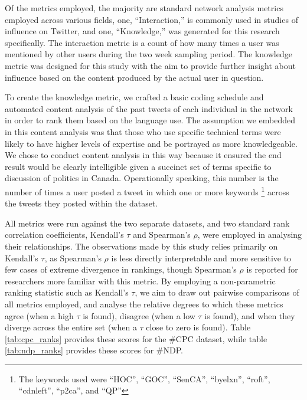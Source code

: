 \documentclass[a4paper,12pt]{article}
\begin{document}
Of the metrics employed, the majority are standard network analysis metrics employed across various fields, one, ``Interaction,'' is commonly used in studies of influence on Twitter, and one, ``Knowledge,'' was generated for this research specifically. The interaction metric is a count of how many times a user was mentioned by other users during the two week sampling period. The knowledge metric was designed for this study with the aim to provide further insight about influence based on the content produced by the actual user in question. 

To create the knowledge metric, we crafted a basic coding schedule and automated content analysis of the past tweets of each individual in the network in order to rank them based on the language use. The assumption we embedded in this content analysis was that those who use specific technical terms were likely to have higher levels of expertise and be portrayed as more knowledgeable. We chose to conduct content analysis in this way because it ensured the end result would be clearly intelligible given a succinct set of terms specific to discussion of politics in Canada. Operationally speaking, this number is the number of times a user posted a tweet in which one or more keywords \footnote{The keywords used were ``HOC'', ``GOC'', ``SenCA'', ``byelxn'', ``roft'', ``cdnleft'', ``p2ca'', and ``QP''} across the tweets they posted within the dataset.

All metrics were run against the two separate datasets, and two standard rank correlation coefficients, Kendall's $\tau$ and Spearman's $\rho$, were employed in analysing their relationships. The observations made by this study relies primarily on Kendall's $\tau$, as Spearman's $\rho$ is less directly interpretable and more sensitive to few cases of extreme divergence in rankings, though Spearman's $\rho$ is reported for researchers more familiar with this metric. By employing a non-parametric ranking statistic such as Kendall's $\tau$, we aim to draw out pairwise comparisons of all metrics employed, and analyse the relative degrees to which these metrics agree (when a high $\tau$ is found), disagree (when a low $\tau$ is found), and when they diverge across the entire set (when a $\tau$ close to zero is found). Table \ref{tab:cpc_ranks} provides these scores for the \#CPC dataset, while table \ref{tab:ndp_ranks} provides these scores for \#NDP.
\end{document}
